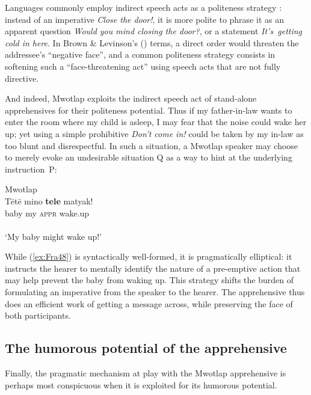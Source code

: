 \documentclass[output=paper,colorlinks,citecolor=brown]{langscibook}
\begin{document}
Languages commonly employ indirect speech acts as a politeness strategy \citep{Searle1975}: instead of an imperative \textit{Close the door!}, it is more polite to phrase it as an apparent question \textit{Would you mind closing the door?}, or a statement \textit{It's~getting cold in here}. In Brown \& Levinson's (\citeyear[70]{BrownLevinson1987}) terms, a direct order would threaten the addressee's ``negative face'', and a common politeness strategy consists in softening such a ``face-threatening act'' using speech acts that are not fully \mbox{directive}.

And indeed, Mwotlap exploits the indirect speech act of stand-alone apprehensives for their politeness potential. Thus if my father-in-law wants to enter the room where my child is asleep, I may fear that the noise could wake her up; yet using a simple prohibitive \textit{Don't come in!} could be taken by my in-law as too blunt and disrespectful. In such a situation, a Mwotlap speaker may choose to merely evoke an undesirable situation Q as a way to hint at the underlying instruction~P:


\ea \label{ex:Fra48} \textnormal{Mwotlap} \francoissource{{[Mtp.AF-AP5-41a]}} \\
\gll Tētē mino \textbf{tele} matyak! \\
baby my \textsc{appr} wake.up \\
 \\
`My baby might wake up!' \\
\z


\noindent While (\ref{ex:Fra48}) is syntactically well-formed, it is pragmatically elliptical: it instructs the hearer to mentally identify the nature of a pre-emptive action that may help prevent the baby from waking up. This strategy shifts the burden of formulating an imperative from the speaker to the hearer. The apprehensive thus does an efficient work of getting a message across, while preserving the face of both participants.




\subsection{The humorous potential of the apprehensive}
\label{subsec:humorous}
 
Finally, the pragmatic mechanism at play with the Mwotlap apprehensive is perhaps most conspicuous when it is exploited for its humorous potential.
\end{document}
